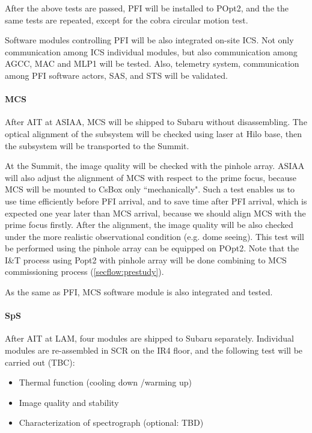 After the above tests are passed, PFI will be installed to POpt2, and the the same tests are repeated, except for the cobra circular motion test.

Software modules controlling PFI will be also integrated on-site ICS.
Not only communication among ICS individual modules, but also communication among AGCC, MAC and MLP1 will be tested.
Also, telemetry system, communication among PFI software actors, SAS, and STS will be validated.

\paragraph{MCS}
After AIT at ASIAA, MCS will be shipped to Subaru without disassembling.
The optical alignment of the subsystem will be checked using laser at Hilo base, then the subsystem will be transported to the Summit.

At the Summit, the image quality will be checked with the pinhole array.
ASIAA will also adjust the alignment of MCS with respect to the prime focus, because MCS will be mounted to CsBox only ``mechanically".
Such a test enables us to use time efficiently before PFI arrival, and to save time after PFI arrival, which is expected one year later than MCS arrival, because we should align MCS with the prime focus firstly.
After the alignment, the image quality will be also checked under the more realistic observational condition (e.g. dome seeing).
This test will be performed using the pinhole array can be equipped on POpt2.
Note that the I\&T process using Popt2 with pinhole array will be done combining to MCS commissioning process (\ref{secflow:prestudy}).

As the same as PFI, MCS software module is also integrated and tested.

\paragraph{SpS}
After AIT at LAM, four modules are shipped to Subaru separately.
Individual modules are re-assembled in SCR on the IR4 floor, and the following test will be carried out (TBC):
\begin{itemize}
\item Thermal function (cooling down /warming up)
\item Image quality and stability
\item Characterization of spectrograph  (optional: TBD)
\end{itemize}

